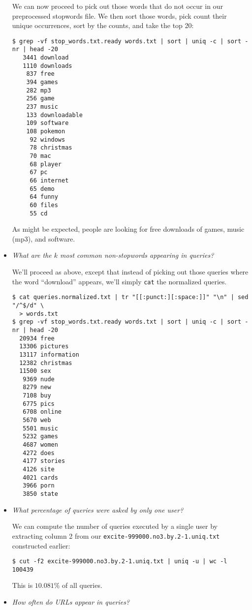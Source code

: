 \begin{itemize}
We can now proceed to pick out those words that do not occur in our
preprocessed stopwords file. We then sort those words, pick count their unique
occurrences, sort by the counts, and take the top 20:

\begin{lstlisting}
$ grep -vf stop_words.txt.ready words.txt | sort | uniq -c | sort -nr | head -20
   3441 download
   1110 downloads
    837 free
    394 games
    282 mp3
    256 game
    237 music
    133 downloadable
    109 software
    108 pokemon
     92 windows
     78 christmas
     70 mac
     68 player
     67 pc
     66 internet
     65 demo
     64 funny
     60 files
     55 cd
\end{lstlisting}

As might be expected, people are looking for free downloads of games, music
(mp3), and software. 

\item \emph{What are the $k$ most common non-stopwords appearing in queries?}

We'll proceed as above, except that instead of picking out those queries where
the word ``download'' appears, we'll simply \texttt{cat} the normalized
queries.

\begin{lstlisting}
$ cat queries.normalized.txt | tr "[[:punct:][:space:]]" "\n" | sed "/^$/d" \
  > words.txt
$ grep -vf stop_words.txt.ready words.txt | sort | uniq -c | sort -nr | head -20
  20934 free
  13306 pictures
  13117 information
  12382 christmas
  11500 sex
   9369 nude
   8279 new
   7108 buy
   6775 pics
   6708 online
   5670 web
   5501 music
   5232 games
   4687 women
   4272 does
   4177 stories
   4126 site
   4021 cards
   3966 porn
   3850 state
\end{lstlisting}

\item \emph{What percentage of queries were asked by only one user?}

We can compute the number of queries executed by a single user by extracting
column 2 from our \texttt{excite-999000.no3.by.2-1.uniq.txt} constructed
earlier:

\begin{lstlisting}
$ cut -f2 excite-999000.no3.by.2-1.uniq.txt | uniq -u | wc -l
100439
\end{lstlisting}

This is $10.081\%$ of all queries.

\item \emph{How often do URLs appear in queries?}


\end{itemize}
